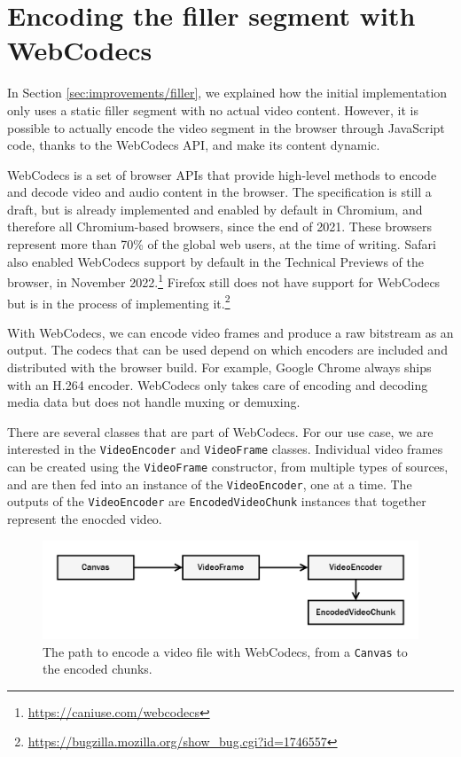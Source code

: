 \section{Encoding the filler segment with WebCodecs}
\label{sec:improvements/webcodecs}

In Section \ref{sec:improvements/filler}, we explained how the initial implementation only uses a static filler segment with no actual video content. However, it is possible to actually encode the video segment in the browser through JavaScript code, thanks to the WebCodecs API, and make its content dynamic.

WebCodecs is a set of browser APIs that provide high-level methods to encode and decode video and audio content in the browser. The specification is still a draft, but is already implemented and enabled by default in Chromium, and therefore all Chromium-based browsers, since the end of 2021. These browsers represent more than 70\% of the global web users, at the time of writing. Safari also enabled WebCodecs support by default in the Technical Previews of the browser, in November 2022.\footnote{\url{https://caniuse.com/webcodecs}} Firefox still does not have support for WebCodecs but is in the process of implementing it.\footnote{\url{https://bugzilla.mozilla.org/show_bug.cgi?id=1746557}}

With WebCodecs, we can encode video frames and produce a raw bitstream as an output. The codecs that can be used depend on which encoders are included and distributed with the browser build. For example, Google Chrome always ships with an H.264 encoder. WebCodecs only takes care of encoding and decoding media data but does not handle muxing or demuxing.

There are several classes that are part of WebCodecs. For our use case, we are interested in the \texttt{VideoEncoder} and \texttt{VideoFrame} classes. Individual video frames can be created using the \texttt{VideoFrame} constructor, from multiple types of sources, and are then fed into an instance of the \texttt{VideoEncoder}, one at a time. The outputs of the \texttt{VideoEncoder} are \texttt{EncodedVideoChunk} instances that together represent the enocded video.\cite{webcodecs}

\begin{figure}[h]
    \centering
    \includegraphics[width=\textwidth]{res/webcodecs.png}
    \caption{The path to encode a video file with WebCodecs, from a \texttt{Canvas} to the encoded chunks.}
    \label{fig:webcodecs_diagram}
\end{figure}

